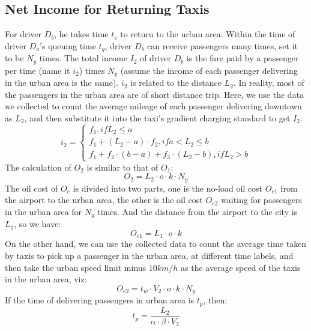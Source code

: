 \subsection{Net Income for Returning Taxis}
For driver $D_{b}$, he takes time $t_{s}$ to return to the urban area. Within the time of driver $D_{a}$'s queuing time $t_{q}$, driver $D_{b}$ can receive passengers many times, set it to be $N_{y}$ times. The total income $I_{2}$ of driver $D_{b}$ is the fare paid by a passenger per time (name it $i_{2}$) times $N_{y}$ (assume the income of each passenger delivering in the urban area is the same). $i_{2}$ is related to the distance $L_{2}$. In reality, most of the passengers in the urban area are of short distance trip. Here, we use the data we collected to count the average mileage of each passenger delivering downtown as $L_{2}$, and then substitute it into the taxi's gradient charging standard to get $I_{2}$:
\begin{equation}
	i_{2} = \left\{\begin{matrix}
f_{1}, if L_{2} \leq a\\ 
f_{1} + (L_{2} - a)\cdot f_{2}, if a < L_{2} \leq b\\ 
f_{1} + f_{2}\cdot(b-a) + f_{3}\cdot(L_{2} - b), if L_{2} > b 
\end{matrix}\right.
\label{i_2}
\end{equation}
The calculation of $O_{2}$ is similar to that of $O_{1}$:
\begin{equation}
	O_{2}= L_{2}\cdot o \cdot k \cdot N_{y}
\label{O_2}
\end{equation}
The oil cost of $O_{e}$ is divided into two parts, one is the no-load oil cost $O_{e1}$ from the airport to the urban area, the other is the oil cost $O_{e2}$ waiting for passengers in the urban area for $N_{y}$ times. And the distance from the airport to the city is $L_{1}$, so we have:
\begin{equation}
	O_{e1}= L_{1}\cdot o \cdot k 
\label{O_e1}
\end{equation}
On the other hand, we can use the collected data to count the average time taken by taxis to pick up a passenger in the urban area, at different time labels, and then take the urban speed limit minus $10km/h$ as the average speed of the taxis in the urban area, viz:
\begin{equation}
	O_{e2}= t_{w}\cdot V_{2} \cdot o \cdot k \cdot N_{y}
\label{O_e2}
\end{equation}
If the time of delivering passengers in urban area is $t_{p}$, then:
\begin{equation}
	t_{p} = \frac{L_{2}}{\alpha \cdot \beta \cdot V_{2}}
\label{t_p}
\end{equation}
